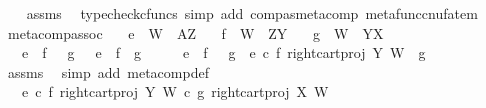 \begin{isabellebody}
%
\isadelimproof
\ \ %
\endisadelimproof
%
\isatagproof
{}\isamarkupfalse%
\ assms\ \isamarkupfalse%
\ {\isacharparenleft}{\kern0pt}typecheck{\isacharunderscore}{\kern0pt}cfuncs{\isacharcomma}{\kern0pt}\ simp\ add{\isacharcolon}{\kern0pt}\ comp{\isacharunderscore}{\kern0pt}as{\isacharunderscore}{\kern0pt}metacomp\ metafunc{\isacharunderscore}{\kern0pt}cnufatem{\isacharparenright}{\kern0pt}%
\endisatagproof
{\isafoldproof}%
%
\isadelimproof
\isanewline
%
\endisadelimproof
\isanewline
{}\isamarkupfalse%
\ meta{\isacharunderscore}{\kern0pt}comp{\isacharunderscore}{\kern0pt}assoc{\isacharcolon}{\kern0pt}\isanewline
\ \ \ {\isachardoublequoteopen}e\ {\isacharcolon}{\kern0pt}\ W\ {\isasymrightarrow}\ A\isactrlbsup Z\isactrlesup {\isachardoublequoteclose}\isanewline
\ \ \ {\isachardoublequoteopen}f\ {\isacharcolon}{\kern0pt}\ W\ {\isasymrightarrow}\ Z\isactrlbsup Y\isactrlesup {\isachardoublequoteclose}\isanewline
\ \ \ {\isachardoublequoteopen}g\ {\isacharcolon}{\kern0pt}\ W\ {\isasymrightarrow}\ Y\isactrlbsup X\isactrlesup {\isachardoublequoteclose}\isanewline
\ \ \ {\isachardoublequoteopen}{\isacharparenleft}{\kern0pt}e\ {\isasymbox}\ f{\isacharparenright}{\kern0pt}\ {\isasymbox}\ \ g\ \ {\isacharequal}{\kern0pt}\ e\ {\isasymbox}\ {\isacharparenleft}{\kern0pt}f\ {\isasymbox}\ g{\isacharparenright}{\kern0pt}{\isachardoublequoteclose}\isanewline
%
\isadelimproof
%
\endisadelimproof
%
\isatagproof
{}\isamarkupfalse%
\ {\isacharminus}{\kern0pt}\isanewline
\ \ \isamarkupfalse%
\ {\isachardoublequoteopen}{\isacharparenleft}{\kern0pt}e\ {\isasymbox}\ f{\isacharparenright}{\kern0pt}\ {\isasymbox}\ \ g\ {\isacharequal}{\kern0pt}\ {\isacharparenleft}{\kern0pt}e\isactrlsup {\isasymflat}\ {\isasymcirc}\isactrlsub c\ {\isasymlangle}f\isactrlsup {\isasymflat}{\isacharcomma}{\kern0pt}\ right{\isacharunderscore}{\kern0pt}cart{\isacharunderscore}{\kern0pt}proj\ Y\ W{\isasymrangle}{\isacharparenright}{\kern0pt}\isactrlsup {\isasymsharp}\ {\isasymbox}\ g{\isachardoublequoteclose}\isanewline
\ \ \ \ \isamarkupfalse%
\ assms\ \isamarkupfalse%
\ {\isacharparenleft}{\kern0pt}simp\ add{\isacharcolon}{\kern0pt}\ meta{\isacharunderscore}{\kern0pt}comp{}{\isacharunderscore}{\kern0pt}def{}{\isacharparenright}{\kern0pt}\isanewline
\ \ \isamarkupfalse%
\ \isamarkupfalse%
\ {\isachardoublequoteopen}{\isachardot}{\kern0pt}{\isachardot}{\kern0pt}{\isachardot}{\kern0pt}\ {\isacharequal}{\kern0pt}\ {\isacharparenleft}{\kern0pt}{\isacharparenleft}{\kern0pt}e\isactrlsup {\isasymflat}\ {\isasymcirc}\isactrlsub c\ {\isasymlangle}f\isactrlsup {\isasymflat}{\isacharcomma}{\kern0pt}\ right{\isacharunderscore}{\kern0pt}cart{\isacharunderscore}{\kern0pt}proj\ Y\ W{\isasymrangle}{\isacharparenright}{\kern0pt}\isactrlsup {\isasymsharp}\isactrlsup {\isasymflat}\ {\isasymcirc}\isactrlsub c\ {\isasymlangle}g\isactrlsup {\isasymflat}{\isacharcomma}{\kern0pt}\ right{\isacharunderscore}{\kern0pt}cart{\isacharunderscore}{\kern0pt}proj\ X\ W{\isasymrangle}{\isacharparenright}{\kern0pt}\isactrlsup {\isasymsharp}{\isachardoublequoteclose}\isanewline

\end{isabellebody}

